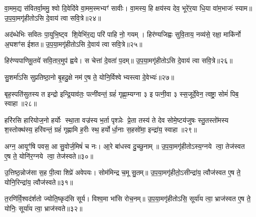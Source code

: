 वा॒मम॒द्य स॑वितर्वा॒ममु॒ श्वो दि॒वेदि॑वे वा॒मम॒स्मभ्यꣳ॑ सावीः। वा॒मस्य॒ हि क्षय॑स्य देव॒ भूरे॑र॒या धि॒या वा॑म॒भाजः॑ स्याम॥ उ॒प॒या॒मगृ॑हीतोऽसि दे॒वाय॑ त्वा सवि॒त्रे॥२४॥

{\anuvakamend[{वा॒मं चतु॑र्विशतिः॥23॥}]}

अद॑ब्धेभिः सवितः पा॒युभि॒ष्ट्व शि॒वेभि॑र॒द्य परि॑ पाहि नो॒ गयम्। हिर॑ण्यजिह्वः सुवि॒ताय॒ नव्य॑से॒ रक्षा॒ माकि॑र्नो अ॒घशꣳ॑स ईशत॥ उ॒प॒या॒मगृ॑हीतोऽसि दे॒वाय॑ त्वा सवि॒त्रे॥२५॥

{\anuvakamend[{अद॑ब्धेभि॒स्त्रयो॑विशतिः॥24॥}]}

हिर॑ण्यपाणिमू॒तये॑ सवि॒तार॒मुप॑ ह्वये। स चेत्ता॑ दे॒वता॑ प॒दम्॥ उ॒प॒या॒मगृ॑हीतोऽसि दे॒वाय॑ त्वा सवि॒त्रे॥२६॥

{\anuvakamend[{हिर॑ण्यपाणिं॒ चतु॑र्दश॥25॥}]}

सु॒शर्मा॑ऽसि सुप्रतिष्ठा॒नो बृ॒हदु॒क्षे नम॑ ए॒ष ते॒ योनि॒र्विश्वेभ्यस्त्वा दे॒वेभ्यः॑॥२७॥

{\anuvakamend[{सु॒शर्मा॒ द्वाद॑श॥26॥}]}

बृह॒स्पति॑सुतस्य त इन्द्रो इन्द्रि॒याव॑तः॒ पत्नी॑वन्तं॒ ग्रहं॑ गृह्णा॒म्यग्ना ३ इ पत्नी॒वा ३ स्स॒जूर्दे॒वेन॒ त्वष्ट्रा॒ सोमं॑ पिब॒ स्वाहा॥२८॥

{\anuvakamend[{बृह॒स्पति॑सुतस्य॒ पञ्च॑दश॥26॥}]}

हरि॑रसि हारियोज॒नो हर्योः स्था॒ता वज्र॑स्य भ॒र्ता पृश्ञेः प्रे॒ता तस्य॑ ते देव सोमे॒ष्टय॑जुषः स्तु॒तस्तो॑मस्य श॒स्तोक्थ॑स्य॒ हरि॑वन्तं॒ ग्रहं॑ गृह्णामि ह॒रीः स्थ॒ हर्योर्धा॒नाः स॒हसो॑मा॒ इन्द्रा॑य॒ स्वाहा॥२९॥

{\anuvakamend[{हरिः॒ षड्विꣳ॑शतिः॥28॥}]}

अग्न॒ आयूꣳ॑षि पवस॒ आ सु॒वोर्ज॒मिषं॑ च नः। आ॒रे बा॑धस्व दु॒च्छुनाम्॥ उ॒प॒या॒मगृ॑हीतोऽस्य॒ग्नये त्वा॒ तेज॑स्वत ए॒ष ते॒ योनि॑र॒ग्नये त्वा॒ तेज॑स्वते॥३०॥

{\anuvakamend[{अग्न॒ आयूꣳ॑षि॒ त्रयो॑वि शतिः॥29॥}]}

उ॒त्तिष्ठ॒न्नोज॑सा स॒ह पी॒त्वा शिप्रे॑ अवेपयः। सोम॑मिन्द्र च॒मू सु॒तम्॥ उ॒प॒या॒मगृ॑हीतो॒ऽसीन्द्रा॑य॒ त्वौज॑स्वत ए॒ष ते॒ योनि॒रिन्द्रा॑य॒ त्वौज॑स्वते॥३१॥

{\anuvakamend[{उ॒त्तिष्ठ॒न्नेक॑विशतिः॥30॥}]}

त॒रणि॑र्वि॒श्वद॑र्\mbox{}शतो ज्योति॒ष्कृद॑सि सूर्य। विश्व॒मा भा॑सि रोच॒नम्॥ उ॒प॒या॒मगृ॑हीतोऽसि॒ सूर्या॑य त्वा॒ भ्राज॑स्वत ए॒ष ते॒ योनिः॒ सूर्या॑य त्वा॒ भ्राज॑स्वते॥३२॥

